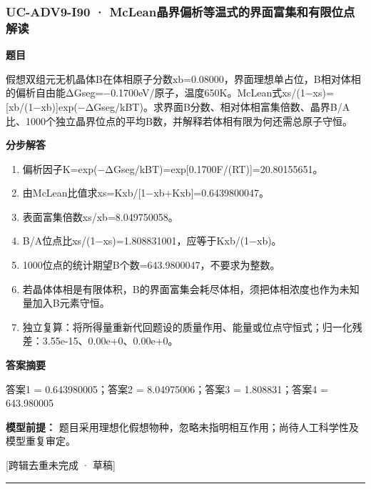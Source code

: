 \documentclass[UTF8,11pt,a4paper]{ctexart}
\begin{document}
\subsubsection*{UC-ADV9-I90 · McLean晶界偏析等温式的界面富集和有限位点解读}
\noindent\textbf{题目}\par
假想双组元无机晶体B在体相原子分数xb=0.08000，界面理想单占位，B相对体相的偏析自由能ΔGseg=−0.1700eV/原子，温度650K。McLean式xs/(1−xs)=[xb/(1−xb)]exp(−ΔGseg/kBT)。求界面B分数、相对体相富集倍数、晶界B/A比、1000个独立晶界位点的平均B数，并解释若体相有限为何还需总原子守恒。\par
\medskip\noindent\textbf{分步解答}
\begin{enumerate}
\item 偏析因子K=exp(−ΔGseg/kBT)=exp[0.1700F/(RT)]=20.80155651。
\item 由McLean比值求xs=Kxb/[1−xb+Kxb]=0.6439800047。
\item 表面富集倍数xs/xb=8.049750058。
\item B/A位点比xs/(1−xs)=1.808831001，应等于Kxb/(1−xb)。
\item 1000位点的统计期望B个数=643.9800047，不要求为整数。
\item 若晶体体相是有限体积，B的界面富集会耗尽体相，须把体相浓度也作为未知量加入B元素守恒。
\item 独立复算：将所得量重新代回题设的质量作用、能量或位点守恒式；归一化残差：3.55e-15、0.00e+0、0.00e+0。
\end{enumerate}
\noindent\textbf{答案摘要}\par
答案1 = 0.643980005；答案2 = 8.04975006；答案3 = 1.808831；答案4 = 643.980005\par
\noindent\textbf{模型前提：}
题目采用理想化假想物种，忽略未指明相互作用；尚待人工科学性及模型重复审定。\par
\noindent\textcolor{red!65!black}{[跨辑去重未完成 · 草稿]} \par
\medskip\hrule\medskip
{}
\end{document}
